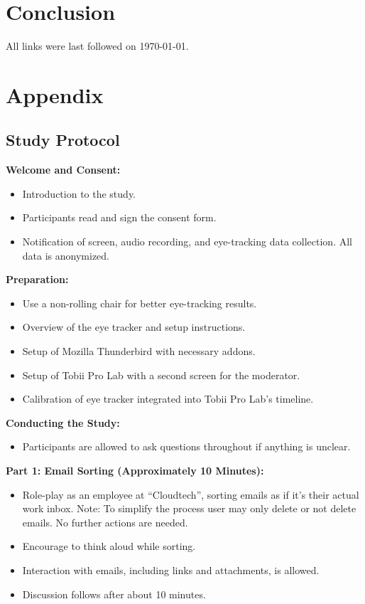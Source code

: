 \documentclass[
  a4paper,  %
  twoside,  %
  bibliography=totoc,
  headsepline,
  cleardoublepage=empty,
  parskip=half,
  draft=false
]{scrbook}
\begin{document}
\chapter{Conclusion}
\label{sec:conclusion}


\printbibliography

All links were last followed on \today{}.

\appendix
\chapter{Appendix}
\section{Study Protocol}
\label{sec:protocol}
\textbf{Welcome and Consent:}
\begin{itemize}
    \item Introduction to the study.
    \item Participants read and sign the consent form.
    \item Notification of screen, audio recording, and eye-tracking data collection. All data is anonymized.
\end{itemize}

\textbf{Preparation:}
\begin{itemize}
    \item Use a non-rolling chair for better eye-tracking results.
    \item Overview of the eye tracker and setup instructions.
    \item Setup of Mozilla Thunderbird with necessary addons.
    \item Setup of Tobii Pro Lab with a second screen for the moderator.
    \item Calibration of eye tracker integrated into Tobii Pro Lab's timeline.
\end{itemize}

\textbf{Conducting the Study:}
\begin{itemize}
    \item Participants are allowed to ask questions throughout if anything is unclear.
\end{itemize}

\textbf{Part 1: Email Sorting (Approximately 10 Minutes):}
\begin{itemize}
    \item Role-play as an employee at ``Cloudtech'', sorting emails as if it's their actual work inbox. Note: To simplify the process user may only delete or not delete emails. No further actions are needed.
    \item Encourage to think aloud while sorting.
    \item Interaction with emails, including links and attachments, is allowed.
    \item Discussion follows after about 10 minutes.
\end{itemize}
\end{document}
